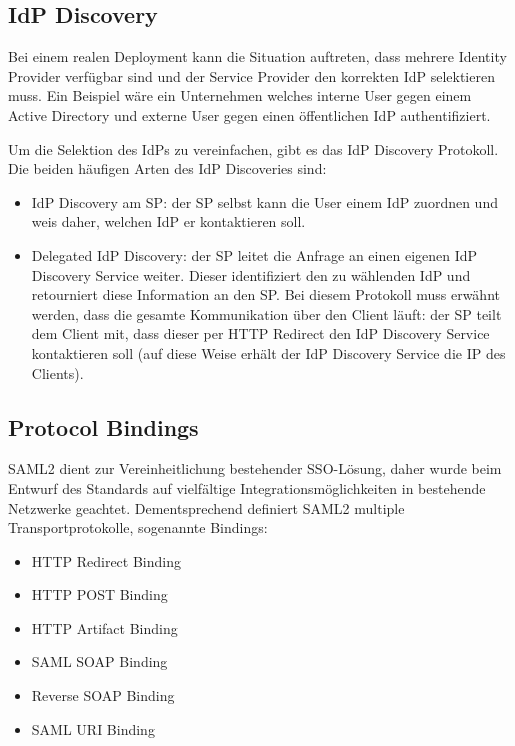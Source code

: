 \subsection{IdP Discovery}

Bei einem realen Deployment kann die Situation auftreten, dass mehrere Identity Provider verfügbar sind und der Service Provider den korrekten IdP selektieren muss. Ein Beispiel wäre ein Unternehmen welches interne User gegen einem Active Directory und externe User gegen einen öffentlichen IdP authentifiziert.

Um die Selektion des IdPs zu vereinfachen, gibt es das IdP Discovery Protokoll. Die beiden häufigen Arten des IdP Discoveries sind:

\begin{itemize}
	\item IdP Discovery am SP: der SP selbst kann die User einem IdP zuordnen und weis daher, welchen IdP er kontaktieren soll.
	\item Delegated IdP Discovery: der SP leitet die Anfrage an einen eigenen IdP Discovery Service weiter. Dieser identifiziert den zu wählenden IdP und retourniert diese Information an den SP. Bei diesem Protokoll muss erwähnt werden, dass die gesamte Kommunikation über den Client läuft: der SP teilt dem Client mit, dass dieser per HTTP Redirect den IdP Discovery Service kontaktieren soll (auf diese Weise erhält der IdP Discovery Service die IP des Clients).
\end{itemize}

\subsection{Protocol Bindings}

SAML2 dient zur Vereinheitlichung bestehender SSO-Lösung, daher wurde beim Entwurf des Standards auf vielfältige Integrationsmöglichkeiten in bestehende Netzwerke geachtet. Dementsprechend definiert SAML2 multiple Transportprotokolle, sogenannte Bindings:

\begin{itemize}
	\item HTTP Redirect Binding
	\item HTTP POST Binding
	\item HTTP Artifact Binding
	\item SAML SOAP Binding
	\item Reverse SOAP Binding
	\item SAML URI Binding
\end{itemize}

